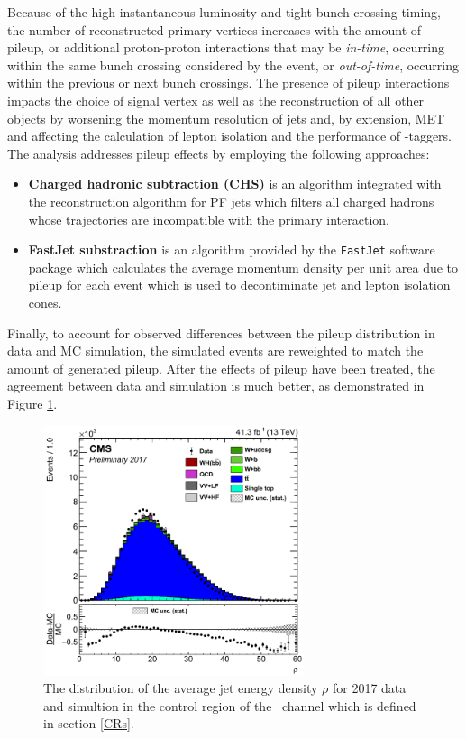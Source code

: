 Because of the high instantaneous luminosity and tight bunch crossing timing, the number of reconstructed primary vertices increases with the amount of pileup, or additional proton-proton interactions that may be \textit{in-time}, occurring within the same bunch crossing considered by the event, or \textit{out-of-time}, occurring within the previous or next bunch crossings. The presence of pileup interactions impacts the choice of signal vertex as well as the reconstruction of all other objects by worsening the momentum resolution of jets and, by extension, MET and affecting the calculation of lepton isolation and the performance of \qrkb-taggers. The analysis addresses pileup effects by employing the following approaches:
\begin{itemize}
  \item \textbf{Charged hadronic subtraction (CHS)} is an algorithm integrated with the reconstruction algorithm for PF jets which filters all charged hadrons whose trajectories are incompatible with the primary interaction.
  \item \textbf{FastJet substraction} is an algorithm provided by the \texttt{FastJet}\cite{FASTJET} software package which calculates the average momentum density per unit area due to pileup for each event which is used to decontiminate jet and lepton isolation cones.
\end{itemize}
Finally, to account for observed differences between the pileup distribution in data and MC simulation, the simulated events are reweighted to match the amount of generated pileup. After the effects of pileup have been treated, the agreement between data and simulation is much better, as demonstrated in Figure \ref{fig:rho}.

\begin{figure}[htbp]
  \centering
    \includegraphics[width=3in]{images/rho}
    \caption[Average Jet Energy Density in 2017 Data]{The distribution of the average jet energy density $\rho$ for 2017 data and simultion in the \qrkt\qrktbar control region of the \WlnH\ channel which is defined in section \ref{CRs}.}
    \label{fig:rho}
\end{figure}

